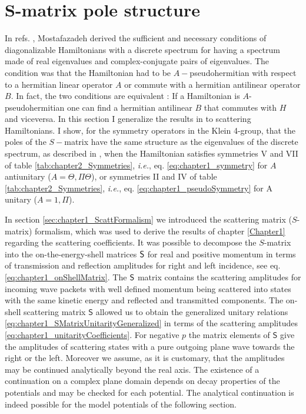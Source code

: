 \section{S-matrix pole structure}
\label{sec:chapter2_SPoles}
%
In refs. \cite{Mostafazadeh2002,Mostafazadeh2002a,Mostafazadeh2002b}, Mostafazadeh derived the sufficient and necessary conditions of diagonalizable Hamiltonians with a discrete spectrum for having a spectrum made of real eigenvalues and complex-conjugate pairs of eigenvalues. The condition was that the Hamiltonian had to be $A-$pseudohermitian with respect to a hermitian linear operator $A$ or commute with a hermitian antilinear operator $B$. In fact, the two conditions are equivalent \cite{Mostafazadeh2002b}: If a Hamiltonian is $A$-pseudohermitian one can find a hermitian antilinear $B$ that commutes with $H$ and viceversa. In this section I generalize the results in \cite{Mostafazadeh2002,Mostafazadeh2002a,Mostafazadeh2002b} to scattering Hamiltonians. I show, for the symmetry operators in the Klein 4-group, that the poles of the $S-$matrix have the same structure as the eigenvalues of the discrete spectrum, as described in \cite{Mostafazadeh2002,Mostafazadeh2002a,Mostafazadeh2002b}, when the Hamiltonian satisfies symmetries V and VII of table \ref{tab:chapter2_Symmetries}, \textit{i.e.}, eq. \eqref{eq:chapter1_symmetry} for $A$ antiunitary ($A = \Theta,\Pi\Theta$), or symmetries II and IV of table \ref{tab:chapter2_Symmetries}, \textit{i.e.}, eq. \eqref{eq:chapter1_pseudoSymmetry} for A unitary ($A = 1,\Pi$).


In section \ref{sec:chapter1_ScattFormalism} we introduced the scattering matrix ($S$-matrix) formalism, which was used to derive the results of chapter \ref{Chapter1} regarding the scattering coefficients. It was possible to decompose the $S$-matrix into the on-the-energy-shell matrices $\sf{S}$ for real and positive momentum in terms of transmission and reflection amplitudes for right
and left incidence, see eq. \eqref{eq:chapter1_onShellMatrix}. The $\sf{S}$ matrix contains the scattering amplitudes for incoming wave packets with well defined momentum being scattered into states with the same kinetic energy and reflected and transmitted components. The on-shell scattering matrix $\mathsf{S}$ allowed us to obtain the generalized unitary relations \eqref{eq:chapter1_SMatrixUnitarityGeneralized} in terms of the scattering amplitudes \eqref{eq:chapter1_unitarityCoefficients}. For negative $p$ the matrix elements of $\mathsf{S}$ give the amplitudes of scattering states with a pure outgoing plane wave towards the right or the left. Moreover we assume, as it is customary, that the amplitudes may be continued analytically beyond the real axis. The existence of a continuation on a complex plane domain depends on decay properties of the potentials and may
be checked for each potential.
The analytical continuation is indeed possible for the model potentials of the following section.

